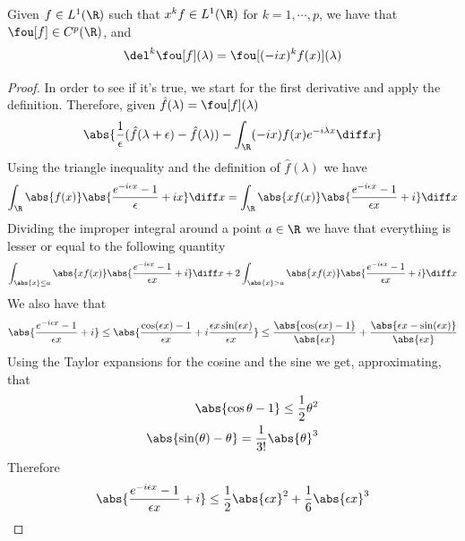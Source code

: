 \documentclass[../mmf.tex]{subfiles}
\begin{document}
\begin{thm}
	Given $f\in L^1(\R)$ such that $x^kf\in L^1(\R)$ for $k=1,\cdots,p$, we have that $\fou[f]\in C^p(\R)$, and
	\begin{equation*}
		\del^k\fou[f](\lambda)=\fou[(-ix)^kf(x)](\lambda)
	\end{equation*}
\end{thm}
\begin{proof}
	In order to see if it's true, we start for the first derivative and apply the definition. Therefore, given $\hat{f}(\lambda)=\fou[f](\lambda)$
	\begin{equation*}
		\abs{\frac{1}{\epsilon}(\hat{f}(\lambda+\epsilon)-\hat{f}(\lambda))-\int_{\R}^{}(-ix)f(x)e^{-i\lambda x}\diff x}
	\end{equation*}
	Using the triangle inequality and the definition of $\hat{f}(\lambda)$ we have
	\begin{equation*}
		\int_{\R}^{}\abs{f(x)}\abs{\frac{e^{-i\epsilon x}-1}{\epsilon}+ix}\diff x=\int_{\R}^{}\abs{xf(x)}\abs{\frac{e^{-i\epsilon x}-1}{\epsilon x}+i}\diff x
	\end{equation*}
	Dividing the improper integral around a point $a\in\R$ we have that everything is lesser or equal to the following quantity
	\begin{equation*}
		\int_{\abs{x}\le a}^{}\abs{xf(x)}\abs{\frac{e^{-i\epsilon x}-1}{\epsilon x}+i}\diff x+2\int_{\abs{x}>a}^{}\abs{xf(x)}\abs{\frac{e^{-i\epsilon x}-1}{\epsilon x}+i}\diff x
	\end{equation*}
	We also have that
	\begin{equation*}
		\abs{\frac{e^{-i\epsilon x}-1}{\epsilon x}+i}\le\abs{\frac{\cos(\epsilon x)-1}{\epsilon x}+i\frac{\epsilon x\sin(\epsilon x)}{\epsilon x}}\le\frac{\abs{\cos(\epsilon x)-1}}{\abs{\epsilon x}}+\frac{\abs{\epsilon x-\sin(\epsilon x)}}{\abs{\epsilon x}}
	\end{equation*}
	Using the Taylor expansions for the cosine and the sine we get, approximating, that
	\begin{equation*}
		\begin{aligned}
			\abs{\cos{\theta}-1}\le\frac{1}{2}\theta^2\\
			\abs{\sin(\theta)-\theta}=\frac{1}{3!}\abs{\theta}^3
		\end{aligned}
	\end{equation*}
	Therefore
	\begin{equation*}
		\abs{\frac{e^{-i\epsilon x}-1}{\epsilon x}+i}\le\frac{1}{2}\abs{\epsilon x}^2+\frac{1}{6}\abs{\epsilon x}^3
	\end{equation*}

\end{proof}
\end{document}
